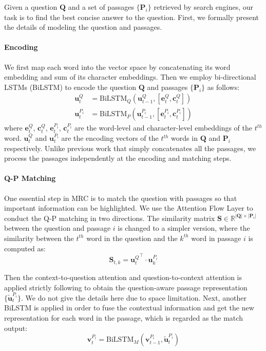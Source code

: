 \documentclass[11pt,a4paper]{article}
\newcommand{\matr}[1]{\mathbf{#1}}
\renewcommand{\vec}[1]{\mathbf{#1}}
\begin{document}
Given a question $\matr{Q}$ and a set of passages 
$\{\matr{P}_i\}$  retrieved by search engines, 
our task is to find the best concise answer to the question. First, we formally present the details of modeling the question and passages.


\paragraph{Encoding} We first map each word into the vector space by concatenating its word embedding and sum of its character embeddings. Then we employ bi-directional LSTMs (BiLSTM) to encode the question $\matr{Q}$ and passages $\{\matr{P}_i\}$ as follows:
\begin{align}
{\vec{u}}_t^Q & = \textrm{BiLSTM}_Q({\vec{u}}_{t-1}^Q, [{\vec{e}}_t^Q, {\vec{c}}_t^Q]) \\
{\vec{u}}_t^{P_i} & = \textrm{BiLSTM}_P({\vec{u}}_{t-1}^{P_i}, [{\vec{e}}_t^{P_i}, {\vec{c}}_t^{P_i}])
\end{align}
\noindent where ${\vec{e}}_t^Q$, ${\vec{c}}_t^Q$, ${\vec{e}}_t^{P_i}$, ${\vec{c}}_t^{P_i}$ are the word-level and character-level embeddings of the $t^{th}$ word. ${\vec{u}}_t^Q$ and ${\vec{u}}_t^{P_i}$ are the encoding vectors of the $t^{th}$ words in $\matr{Q}$ and $\matr{P}_i$ respectively.
Unlike previous work \cite{rnet} that simply concatenates all the passages, we process the passages independently at the encoding and matching steps. 

\paragraph{Q-P Matching} One essential step in MRC is to match the question with passages so that important information can be highlighted. We use the Attention Flow Layer \cite{bidaf} to conduct the Q-P matching in two directions. The similarity matrix $\matr{S} \in \mathbb{R}^{|\matr{Q}|
\times |\matr{P}_i|}$ between the question and passage $i$ is changed to a simpler version, where the similarity between the $t^{th}$ word in the question and the $k^{th}$ word in passage $i$ is computed as:
\begin{equation}
	\matr{S}_{t,k} = {{\vec{u}}_t^Q}^{\intercal} \cdot {\vec{u}}_k^{P_i}
\end{equation}


Then the context-to-question attention and question-to-context attention is applied strictly following  to obtain the question-aware passage representation $\{{\vec{\tilde{u}}}_t^{P_i}\}$.
We do not give the details here due to space limitation. Next, another BiLSTM is applied in order to fuse the contextual information and get the new representation for each word in the passage, which is regarded as the match output:
\begin{equation}
	{\vec{v}}_t^{P_i} = \textrm{BiLSTM}_M({\vec{v}}_{t-1}^{P_i}, {\vec{\tilde{u}}}_t^{P_i})
\end{equation}
\end{document}
